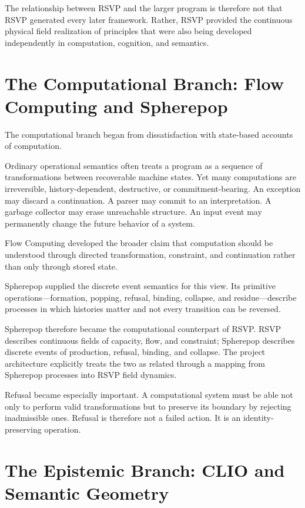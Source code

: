 \documentclass[11pt,oneside]{book}
\numberwithin{equation}{chapter}
\theoremstyle{definition}
\theoremstyle{plain}
\begin{document}
The relationship between RSVP and the larger program is therefore not that
RSVP generated every later framework. Rather, RSVP provided the continuous
physical field realization of principles that were also being developed
independently in computation, cognition, and semantics.

\section{The Computational Branch: Flow Computing and Spherepop}

The computational branch began from dissatisfaction with state-based
accounts of computation.

Ordinary operational semantics often treats a program as a sequence of
transformations between recoverable machine states. Yet many computations
are irreversible, history-dependent, destructive, or commitment-bearing. An
exception may discard a continuation. A parser may commit to an
interpretation. A garbage collector may erase unreachable structure. An
input event may permanently change the future behavior of a system.

Flow Computing developed the broader claim that computation should be
understood through directed transformation, constraint, and continuation
rather than only through stored state.

Spherepop supplied the discrete event semantics for this view. Its
primitive operations---formation, popping, refusal, binding, collapse, and
residue---describe processes in which histories matter and not every
transition can be reversed.

Spherepop therefore became the computational counterpart of RSVP. RSVP
describes continuous fields of capacity, flow, and constraint; Spherepop
describes discrete events of production, refusal, binding, and collapse.
The project architecture explicitly treats the two as related through a
mapping from Spherepop processes into RSVP field dynamics.

Refusal became especially important. A computational system must be able
not only to perform valid transformations but to preserve its boundary by
rejecting inadmissible ones. Refusal is therefore not a failed action. It is
an identity-preserving operation.

\section{The Epistemic Branch: CLIO and Semantic Geometry}
\end{document}
